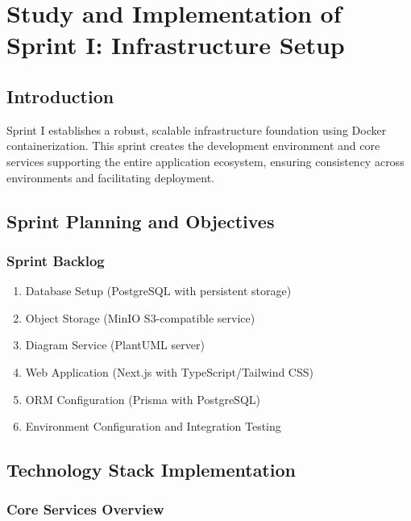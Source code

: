 \chapter[Sprint I]{Study and Implementation of Sprint I: Infrastructure Setup}

\section{Introduction}

Sprint I establishes a robust, scalable infrastructure foundation using  Docker containerization. This sprint creates the development environment and core services supporting the entire application ecosystem, ensuring consistency across environments and facilitating deployment.

\section{Sprint Planning and Objectives}

\subsection{Sprint Backlog}
\begin{enumerate}
    \item Database Setup (PostgreSQL with persistent storage)
    \item Object Storage (MinIO S3-compatible service)
    \item Diagram Service (PlantUML server)
    \item Web Application (Next.js with TypeScript/Tailwind CSS)
    \item ORM Configuration (Prisma with PostgreSQL)

    \item Environment Configuration and Integration Testing
\end{enumerate}

\section{Technology Stack Implementation}

\subsection{Core Services Overview}

